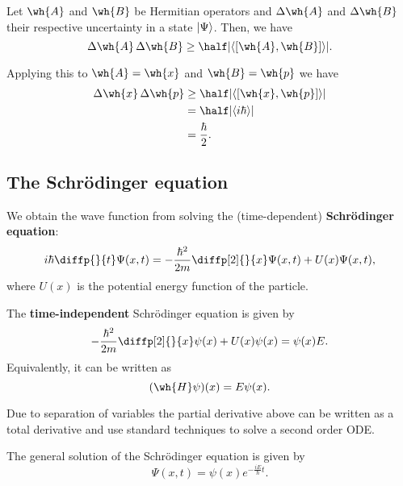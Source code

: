 \documentclass[12pt, a4paper]{article}
\begin{document}
\begin{mdthm}
    Let \(\wh{A}\) and \(\wh{B}\) be Hermitian operators and \(\Delta \wh{A}\) and \(\Delta \wh{B}\) their respective uncertainty in a state \(\ket{\Psi}\). Then, we have
    \[\Delta \wh{A} \, \Delta \wh{B} \geq \half \abs{ \left\langle \left[\wh{A},\wh{B}\right] \right\rangle }.\]
\end{mdthm}

\begin{mdexample}
    Applying this to \(\wh{A}=\wh{x}\) and \(\wh{B}=\wh{p}\) we have 
    \[\begin{aligned}
        \Delta\wh{x} \, \Delta\wh{p} &\geq \half \abs{ \left\langle \left[\wh{x},\wh{p}\right] \right\rangle } \\
        &= \half \abs{\langle i\hbar \rangle} \\
        &= \frac{\hbar}{2}.
    \end{aligned}\] 
\end{mdexample}

\subsection{The Schrödinger equation}

\begin{mdthm}
    We obtain the wave function from solving the (time-dependent) \textbf{Schrödinger equation}:
    \[i \hbar \diffp{}{t} \Psi(x,t) = - \frac{\hbar^2}{2m} \diffp[2]{}{x}\Psi(x,t) + U(x)\Psi(x,t),\]
    where \(U(x)\) is the potential energy function of the particle.
\end{mdthm}

\begin{mdthm}
    The \textbf{time-independent} Schrödinger equation is given by 
    \[- \frac{\hbar^2}{2m} \diffp[2]{}{x}\psi(x)+U(x)\psi(x)=\psi(x)E.\]
    Equivalently, it can be written as 
    \[(\wh{H}\psi)(x)=E\psi(x).\]
\end{mdthm}

\begin{mdnote}
    Due to separation of variables the partial derivative above can be written as a total derivative and use standard techniques to solve a second order ODE.
\end{mdnote}

\begin{mdcor}
    The general solution of the Schrödinger equation is given by 
    \[\Psi(x,t) = \psi(x) e^{ -\frac{iE}{\hbar} t}.\]
\end{mdcor}
\end{document}
